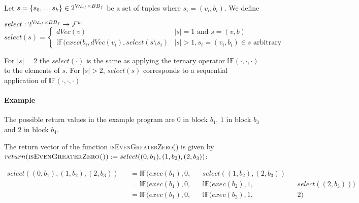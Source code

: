 \begin{definition}
    Let $s = \{s_0, ..., s_k\} \in 2^{\textsc{Val}_f \times BB_f}$ be a set of tuples where $s_i = (v_i, b_i)$. We define
    \begin{center}
        $select: 2^{\textsc{Val}_f \times BB_f} \to \mathcal{F}^w$
        $select(s) = \begin{cases}
            dVec(v) & |s| = 1 \text{ and } s = {(v, b)} \\
            \mathbb{IF}(exec(b_i, dVec(v_i), select(s \setminus s_i) & |s| > 1, s_i = (v_i, b_i) \in s \text{ arbitrary}
        \end{cases}$
    \end{center}
    For $|s| = 2$ the $select(\cdot)$ is the same as applying the ternary operator $\mathbb{IF}(\cdot, \cdot, \cdot)$ to the elements of $s$. For $|s| > 2$, $select(s)$ corresponds to a sequential application of $\mathbb{IF}(\cdot, \cdot, \cdot)$
\end{definition}

\paragraph{Example}
The possible return values in the example program are $0$ in block $b_1$, $1$ in block $b_3$ and $2$ in block $b_4$.

The return vector of the function \textsc{isEvenGreaterZero()} is given by \\ $return(\textsc{isEvenGreaterZero()}) := select({(0, b_1), (1, b_2), (2, b_3)})$:

\begin{align*}
    select({(0, b_1), (1, b_2), (2, b_3)}) && = \mathbb{IF}(exec(b_1), 0, && select({(1, b_2), (2, b_3)}) && \\
     && = \mathbb{IF}(exec(b_1), 0, && \mathbb{IF}(exec(b_2), 1, && select({(2, b_3)})) \\
      && = \mathbb{IF}(exec(b_1), 0, && \mathbb{IF}(exec(b_2), 1, && 2) \\
\end{align*}


